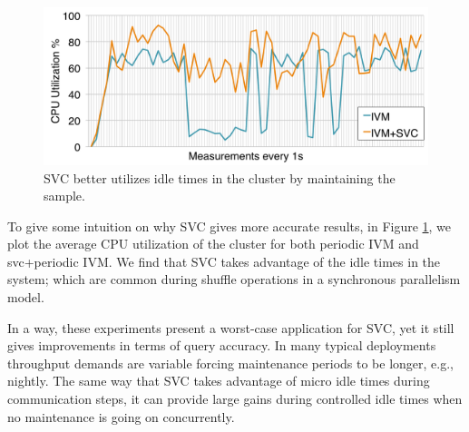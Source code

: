 \begin{figure}[t]
\centering
\includegraphics[scale=0.20]{exp/con_7.pdf}
 \caption{SVC better utilizes idle times in the cluster by maintaining the sample.\label{conv-5}} 
\end{figure}
To give some intuition on why SVC gives more accurate results, in Figure \ref{conv-5}, we plot the average CPU utilization of the cluster for both periodic IVM and svc+periodic IVM. 
We find that SVC takes advantage of the idle times in the system; which are common during shuffle operations in a synchronous parallelism model.

In a way, these experiments present a worst-case application for SVC, yet it still gives improvements in terms of query accuracy.
In many typical deployments throughput demands are variable forcing maintenance periods to be longer, e.g., nightly.
The same way that SVC takes advantage of micro idle times during communication steps, it can provide large gains during controlled idle times when no maintenance is going on concurrently.


